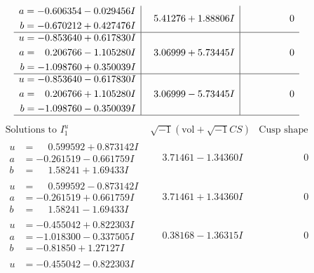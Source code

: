 \documentclass[1p]{elsarticle_modified}
\theoremstyle{definition}
\newcommand{\I}{\sqrt{-1}}
\begin{document}
$$\begin{array}{c|c|c}
\begin{aligned}
a &= -0.606354 - 0.029456 I \\
b &= -0.670212 + 0.427476 I\end{aligned}
 & \phantom{-}5.41276 + 1.88806 I & \phantom{-0.000000 } 0 \\ \hline\begin{aligned}
u &= -0.853640 + 0.617830 I \\
a &= \phantom{-}0.206766 - 1.105280 I \\
b &= -1.098760 + 0.350039 I\end{aligned}
 & \phantom{-}3.06999 + 5.73445 I & \phantom{-0.000000 } 0 \\ \hline\begin{aligned}
u &= -0.853640 - 0.617830 I \\
a &= \phantom{-}0.206766 + 1.105280 I \\
b &= -1.098760 - 0.350039 I\end{aligned}
 & \phantom{-}3.06999 - 5.73445 I & \phantom{-0.000000 } 0\\
 \hline 
 \end{array}$$\newpage$$\begin{array}{c|c|c}  
\text{Solutions to }I^u_{1}& \I (\text{vol} + \sqrt{-1}CS) & \text{Cusp shape}\\
 \hline 
\begin{aligned}
u &= \phantom{-}0.599592 + 0.873142 I \\
a &= -0.261519 - 0.661759 I \\
b &= \phantom{-}1.58241 + 1.69433 I\end{aligned}
 & \phantom{-}3.71461 - 1.34360 I & \phantom{-0.000000 } 0 \\ \hline\begin{aligned}
u &= \phantom{-}0.599592 - 0.873142 I \\
a &= -0.261519 + 0.661759 I \\
b &= \phantom{-}1.58241 - 1.69433 I\end{aligned}
 & \phantom{-}3.71461 + 1.34360 I & \phantom{-0.000000 } 0 \\ \hline\begin{aligned}
u &= -0.455042 + 0.822303 I \\
a &= -1.018300 - 0.337505 I \\
b &= -0.81850 + 1.27127 I\end{aligned}
 & \phantom{-}0.38168 - 1.36315 I & \phantom{-0.000000 } 0 \\ \hline\begin{aligned}
u &= -0.455042 - 0.822303 I \\

\end{aligned}
\end{array}$$
\end{document}
